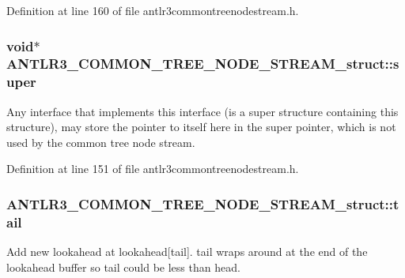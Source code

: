 Definition at line 160 of file antlr3commontreenodestream.\-h.

\hypertarget{struct_a_n_t_l_r3___c_o_m_m_o_n___t_r_e_e___n_o_d_e___s_t_r_e_a_m__struct_acbd1565a6e81ba861184e87f43364d8f}{
\subsubsection[{super}]{\setlength{\rightskip}{0pt plus 5cm}void$\ast$ A\-N\-T\-L\-R3\-\_\-\-C\-O\-M\-M\-O\-N\-\_\-\-T\-R\-E\-E\-\_\-\-N\-O\-D\-E\-\_\-\-S\-T\-R\-E\-A\-M\-\_\-struct\-::super}}\label{struct_a_n_t_l_r3___c_o_m_m_o_n___t_r_e_e___n_o_d_e___s_t_r_e_a_m__struct_acbd1565a6e81ba861184e87f43364d8f}
Any interface that implements this interface (is a super structure containing this structure), may store the pointer to itself here in the super pointer, which is not used by the common tree node stream. 

Definition at line 151 of file antlr3commontreenodestream.\-h.

\hypertarget{struct_a_n_t_l_r3___c_o_m_m_o_n___t_r_e_e___n_o_d_e___s_t_r_e_a_m__struct_aca56f8c2cf7b3f869941236744043c5b}{
\subsubsection[{tail}]{ A\-N\-T\-L\-R3\-\_\-\-C\-O\-M\-M\-O\-N\-\_\-\-T\-R\-E\-E\-\_\-\-N\-O\-D\-E\-\_\-\-S\-T\-R\-E\-A\-M\-\_\-struct\-::tail}}\label{struct_a_n_t_l_r3___c_o_m_m_o_n___t_r_e_e___n_o_d_e___s_t_r_e_a_m__struct_aca56f8c2cf7b3f869941236744043c5b}
Add new lookahead at lookahead\mbox{[}tail\mbox{]}. tail wraps around at the end of the lookahead buffer so tail could be less than head. 

